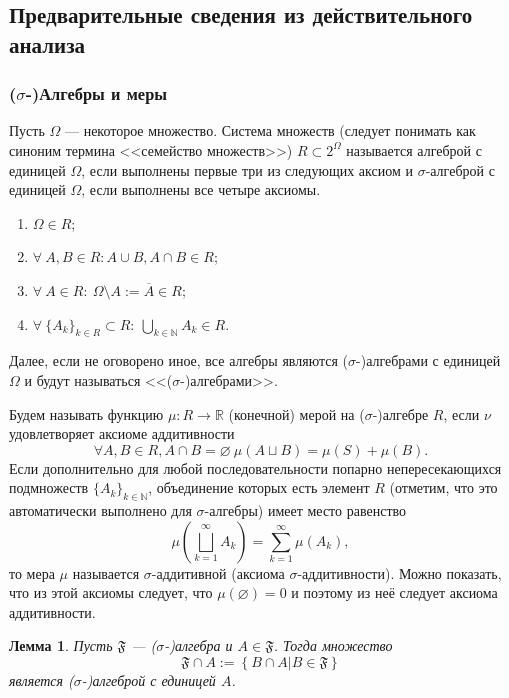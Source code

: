 \documentclass[12pt]{article}
\newtheorem{lemma}[theorem]{Лемма}
\numberwithin{theorem}{section}
\numberwithin{proposition}{section}
\theoremstyle{definition}
\newcommand{\RR}{\mathbb{R}}
\newcommand{\defin}[2]{\hypertarget{#2}{{\color{red} #1}}}
\newcommand{\events}{\mathfrak{F}}
\newcommand{\defineset}[2]{\left\{
	\left.
	#1
	\right\vert
	#2
	\right\}}
\begin{document}
	\subsection{Предварительные сведения из действительного анализа}
	
	\subsubsection{($ \sigma $-)Алгебры и меры}
	
	Пусть $ \Omega $ --- некоторое множество.
	Система множеств (следует понимать как синоним термина <<семейство множеств>>) 
	$ R \subset 2^{\Omega} $ называется \defin{алгеброй с единицей $ \Omega $}{algebra}, если выполнены первые три из следующих аксиом и \defin{$ \sigma $-алгеброй с единицей $ \Omega $}{sigma-algebra}, если выполнены все четыре аксиомы.
	\begin{enumerate}
		\item $ \Omega \in R $;
		\item $ \forall \ A, B \in R: A \cup B, A \cap B \in R $;
		\item $ \forall \ A \in R: \ \Omega \setminus A := \overline{A} \in R $;
		\item $ \forall \ \{A_k\}_{k \in R} \subset R: \ \bigcup\limits_{k \in \mathbb{N}} A_k \in R $.
	\end{enumerate}
	 
	Далее, если не оговорено иное, все алгебры являются ($ \sigma $-)алгебрами с единицей $ \Omega $
	и будут называться <<($ \sigma $-)алгебрами>>.
	
	Будем называть функцию $ \mu \colon R \to \RR $ \defin{(конечной) мерой}{measure} на ($ \sigma $-)алгебре $ R $, 
	если $ \nu $ удовлетворяет аксиоме аддитивности
	$$ \forall A, B \in R, A \cap B = \varnothing \ \mu(A \sqcup B) = \mu(S) + \mu(B). $$
	Если дополнительно для любой последовательности попарно непересекающихся подмножеств $ \{A_k\}_{k \in \mathbb{N}} $,
	объединение которых есть элемент $ R $ (отметим, что это автоматически выполнено для $ \sigma $-алгебры)
	имеет место равенство 
	$$ \mu\left(\bigsqcup\limits_{k = 1}^{\infty} A_k \right) = \sum\limits_{k = 1}^{\infty} \mu(A_k), $$
	то мера $ \mu $ называется \defin{$ \sigma $-аддитивной}{sigma-measure} (аксиома $ \sigma $-аддитивности).
	Можно показать, что из этой аксиомы следует, что $ \mu(\varnothing) = 0 $ и поэтому из неё следует аксиома аддитивности.
	
	\begin{lemma} \label{algebra restriction}
		Пусть $ \events $ --- ($ \sigma $-)алгебра и $ A \in \events $.
		Тогда множество $$ \events \cap A := \defineset{B \cap A}{B \in \events} $$ является ($ \sigma $-)алгеброй
		с единицей $ A $.
	\end{lemma}
	
\end{document}
